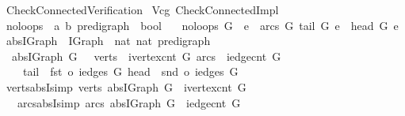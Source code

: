 %
\begin{isabellebody}%
\def\isabellecontext{Check{\isacharunderscore}Connected{\isacharunderscore}Verification}%
%
\isadelimtheory
%
\endisadelimtheory
%
\isatagtheory
{}\isamarkupfalse%
\ Check{\isacharunderscore}Connected{\isacharunderscore}Verification\isanewline
{}\ Vcg\ Check{\isacharunderscore}Connected{\isacharunderscore}Impl\isanewline
{}%
\endisatagtheory
{\isafoldtheory}%
%
\isadelimtheory
\isanewline
%
\endisadelimtheory
\isanewline
{}\isamarkupfalse%
\ no{\isacharunderscore}loops\ {\isacharcolon}{\isacharcolon}\ {\isachardoublequoteopen}{\isacharparenleft}{\isacharprime}a{\isacharcomma}\ {\isacharprime}b{\isacharparenright}\ pre{\isacharunderscore}digraph\ {\isasymRightarrow}\ bool{\isachardoublequoteclose}\ \isanewline
\ \ {\isachardoublequoteopen}no{\isacharunderscore}loops\ G\ {\isasymequiv}\ {\isasymforall}e\ {\isasymin}\ arcs\ G{\isachardot}\ tail\ G\ e\ {\isasymnoteq}\ head\ G\ e{\isachardoublequoteclose}\isanewline
\isanewline
{}\isamarkupfalse%
\ abs{\isacharunderscore}IGraph\ {\isacharcolon}{\isacharcolon}\ {\isachardoublequoteopen}IGraph\ {\isasymRightarrow}\ {\isacharparenleft}nat{\isacharcomma}\ nat{\isacharparenright}\ pre{\isacharunderscore}digraph{\isachardoublequoteclose}\ \isanewline
\ \ {\isachardoublequoteopen}abs{\isacharunderscore}IGraph\ G\ {\isasymequiv}\ {\isasymlparr}\ verts\ {\isacharequal}\ {\isacharbraceleft}{}{\isachardot}{\isachardot}{\isacharless}ivertex{\isacharunderscore}cnt\ G{\isacharbraceright}{\isacharcomma}\ arcs\ {\isacharequal}\ {\isacharbraceleft}{}{\isachardot}{\isachardot}{\isacharless}iedge{\isacharunderscore}cnt\ G{\isacharbraceright}{\isacharcomma}\isanewline
\ \ \ \ tail\ {\isacharequal}\ fst\ o\ iedges\ G{\isacharcomma}\ head\ {\isacharequal}\ snd\ o\ iedges\ G\ {\isasymrparr}{\isachardoublequoteclose}\isanewline
\isanewline
{}\isamarkupfalse%
\ verts{\isacharunderscore}absI{\isacharbrackleft}simp{\isacharbrackright}{\isacharcolon}\ {\isachardoublequoteopen}verts\ {\isacharparenleft}abs{\isacharunderscore}IGraph\ G{\isacharparenright}\ {\isacharequal}\ {\isacharbraceleft}{}{\isachardot}{\isachardot}{\isacharless}ivertex{\isacharunderscore}cnt\ G{\isacharbraceright}{\isachardoublequoteclose}\isanewline
\ \ \ arcs{\isacharunderscore}absI{\isacharbrackleft}simp{\isacharbrackright}{\isacharcolon}\ {\isachardoublequoteopen}arcs\ {\isacharparenleft}abs{\isacharunderscore}IGraph\ G{\isacharparenright}\ {\isacharequal}\ {\isacharbraceleft}{}{\isachardot}{\isachardot}{\isacharless}iedge{\isacharunderscore}cnt\ G{\isacharbraceright}{\isachardoublequoteclose}\isanewline

\end{isabellebody}
